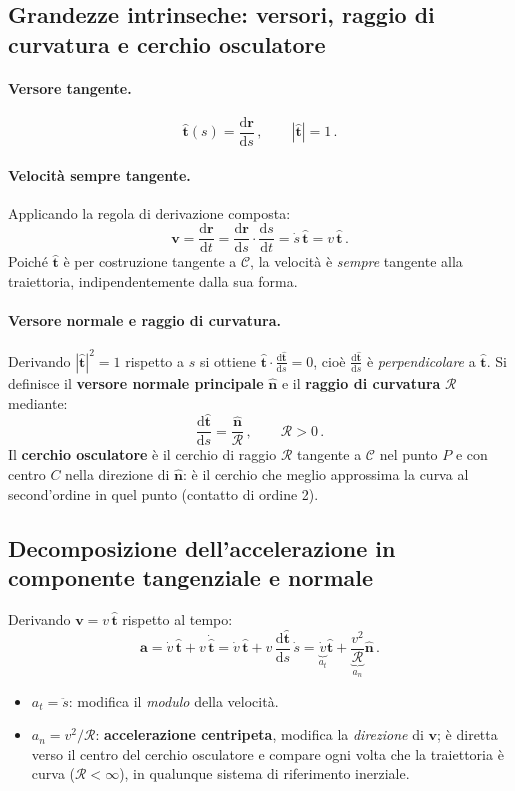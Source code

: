 \documentclass[11pt,a4paper]{article}
\renewcommand{\vec}[1]{\bm{#1}}
\newcommand{\vt}{\hat{\bm{t}}}
\newcommand{\vn}{\hat{\bm{n}}}
\theoremstyle{plain}
\theoremstyle{definition}
\theoremstyle{remark}
\begin{document}
\subsection{Grandezze intrinseche: versori, raggio di curvatura e cerchio
osculatore}

\paragraph{Versore tangente.}
\[
  \vt(s)=\frac{\mathrm{d}\vec{r}}{\mathrm{d}s}\,,\qquad |\vt|=1\,.
\]
\paragraph{Velocità sempre tangente.}
Applicando la regola di derivazione composta:
\[
  \vec{v}=\frac{\mathrm{d}\vec{r}}{\mathrm{d}t}
         =\frac{\mathrm{d}\vec{r}}{\mathrm{d}s}\cdot\frac{\mathrm{d}s}{\mathrm{d}t}
         =\dot{s}\,\vt = v\,\vt\,.
\]
Poiché $\vt$ è per costruzione tangente a $\mathcal{C}$, la velocità è
\emph{sempre} tangente alla traiettoria, indipendentemente dalla sua forma.

\paragraph{Versore normale e raggio di curvatura.}
Derivando $|\vt|^2=1$ rispetto a $s$ si ottiene
$\vt\cdot\frac{\mathrm{d}\vt}{\mathrm{d}s}=0$, cioè $\frac{\mathrm{d}\vt}{\mathrm{d}s}$
è \emph{perpendicolare} a $\vt$. Si definisce il \textbf{versore normale
principale} $\vn$ e il \textbf{raggio di curvatura} $\mathcal{R}$ mediante:
\[
  \frac{\mathrm{d}\vt}{\mathrm{d}s}=\frac{\vn}{\mathcal{R}}\,,\qquad \mathcal{R}>0\,.
\]
Il \textbf{cerchio osculatore} è il cerchio di raggio $\mathcal{R}$ tangente a
$\mathcal{C}$ nel punto $P$ e con centro $C$ nella direzione di $\vn$: è il
cerchio che meglio approssima la curva al second'ordine in quel punto
(contatto di ordine 2).

\subsection{Decomposizione dell'accelerazione in componente tangenziale e
normale}

Derivando $\vec{v}=v\,\vt$ rispetto al tempo:
\[
  \vec{a}
    =\dot{v}\,\vt + v\,\dot{\vt}
    =\dot{v}\,\vt + v\,\frac{\mathrm{d}\vt}{\mathrm{d}s}\,\dot{s}
    =\underbrace{\dot{v}}_{a_t}\vt
     +\underbrace{\frac{v^2}{\mathcal{R}}}_{a_n}\vn\,.
\]
\begin{itemize}
  \item $a_t=\ddot{s}$: modifica il \emph{modulo} della velocità.
  \item $a_n=v^2/\mathcal{R}$: \textbf{accelerazione centripeta}, modifica la
    \emph{direzione} di $\vec{v}$; è diretta verso il centro del cerchio
    osculatore e compare ogni volta che la traiettoria è curva ($\mathcal{R}<\infty$),
    in qualunque sistema di riferimento inerziale.
\end{itemize}
\end{document}

